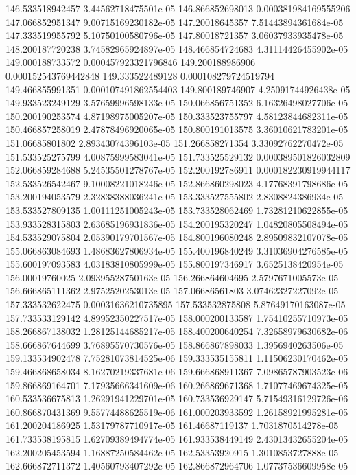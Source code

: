 {146.533518942457 3.44562718475501e-05
146.866852698013 0.000381984169555206
147.066852951347 9.00715169230182e-05
147.20018645357 7.51443894361684e-05
147.333519955792 5.10750100580796e-05
147.80018721357 3.06037933935478e-05
148.200187720238 3.74582965924897e-05
148.466854724683 4.31114426455902e-05
149.000188733572 0.000457923321796846
149.200188986906 0.000152543769442848
149.333522489128 0.000108279724519794
149.466855991351 0.000107491862554403
149.800189746907 4.25091744926438e-05
149.933523249129 3.57659996598133e-05
150.066856751352 6.16326498027706e-05
150.200190253574 4.87198975005207e-05
150.333523755797 4.58123844682311e-05
150.466857258019 2.47878496920065e-05
150.800191013575 3.36010621783201e-05
151.06685801802 2.89343074396103e-05
151.266858271354 3.33092762270472e-05
151.533525275799 4.00875999583041e-05
151.733525529132 0.000389501826032809
152.066859284688 5.24535501278767e-05
152.200192786911 0.000182230919944117
152.533526542467 9.10008221018246e-05
152.866860298023 4.17768391798686e-05
153.200194053579 2.32838388036241e-05
153.333527555802 2.8308824386934e-05
153.533527809135 1.00111251005243e-05
153.733528062469 1.73281210622855e-05
153.933528315803 2.63685196931836e-05
154.200195320247 1.04820805508494e-05
154.533529075804 2.05390179701567e-05
154.800196080248 2.89509832107078e-05
155.066863084693 1.48683627806934e-05
155.400196840249 3.31036904276585e-05
155.600197093583 4.03183810805999e-05
155.800197346917 3.6525138420954e-05
156.00019760025 2.09395528750163e-05
156.266864604695 2.5797671005573e-05
156.666865111362 2.9752520253013e-05
157.06686561803 3.07462327227092e-05
157.333532622475 0.00031636210735895
157.533532875808 5.87649170163087e-05
157.733533129142 4.89952350227517e-05
158.000200133587 1.75410255710973e-05
158.266867138032 1.28125144685217e-05
158.400200640254 7.32658979630682e-06
158.666867644699 3.76895570730576e-05
158.866867898033 1.3956940263506e-05
159.133534902478 7.75281073814525e-06
159.333535155811 1.11506230170462e-05
159.466868658034 8.16270219337681e-06
159.666868911367 7.09865787903523e-06
159.866869164701 7.17935666341609e-06
160.266869671368 1.71077469674325e-05
160.533536675813 1.26291941229701e-05
160.733536929147 5.71549316129726e-06
160.866870431369 9.55774488625519e-06
161.000203933592 1.26158921995281e-05
161.200204186925 1.53179787710917e-05
161.46687119137 1.7031870514278e-05
161.733538195815 1.62709389494774e-05
161.933538449149 2.43013432655204e-05
162.200205453594 1.16887250584462e-05
162.53353920915 1.3010853727888e-05
162.666872711372 1.40560793407292e-05
162.866872964706 1.07737536609958e-05
}
